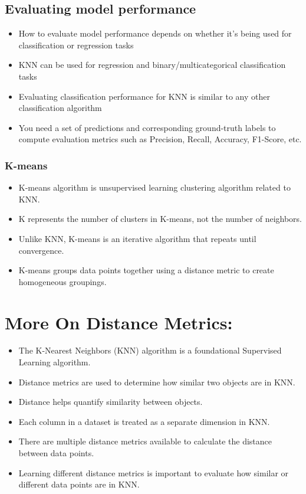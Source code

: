 \documentclass[11pt]{article}
\providecommand{\tightlist}{%
      \setlength{\itemsep}{0pt}\setlength{\parskip}{0pt}}
\begin{document}
\hypertarget{evaluating-model-performance}{%
\subsection{Evaluating model
performance}\label{evaluating-model-performance}}

\begin{itemize}
\tightlist
\item
  How to evaluate model performance depends on whether it's being used
  for classification or regression tasks
\item
  KNN can be used for regression and binary/multicategorical
  classification tasks
\item
  Evaluating classification performance for KNN is similar to any other
  classification algorithm
\item
  You need a set of predictions and corresponding ground-truth labels to
  compute evaluation metrics such as Precision, Recall, Accuracy,
  F1-Score, etc.
\end{itemize}

\hypertarget{k-means}{%
\subsubsection{K-means}\label{k-means}}

\begin{itemize}
\tightlist
\item
  K-means algorithm is unsupervised learning clustering algorithm
  related to KNN.
\item
  K represents the number of clusters in K-means, not the number of
  neighbors.
\item
  Unlike KNN, K-means is an iterative algorithm that repeats until
  convergence.
\item
  K-means groups data points together using a distance metric to create
  homogeneous groupings.
\end{itemize}

    \hypertarget{more-on-distance-metrics}{%
\section{More On Distance Metrics:}\label{more-on-distance-metrics}}

\begin{itemize}
\tightlist
\item
  The K-Nearest Neighbors (KNN) algorithm is a foundational Supervised
  Learning algorithm.
\item
  Distance metrics are used to determine how similar two objects are in
  KNN.
\item
  Distance helps quantify similarity between objects.
\item
  Each column in a dataset is treated as a separate dimension in KNN.
\item
  There are multiple distance metrics available to calculate the
  distance between data points.
\item
  Learning different distance metrics is important to evaluate how
  similar or different data points are in KNN.
\end{itemize}
\end{document}
